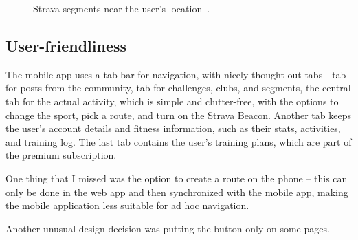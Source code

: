 \begin{figure}[htb!]
    \centering
        \caption{Strava segments near the user's location~\cite{strava-segments-img}.}
        \label{strava-segments-img}
\end{figure}

\subsection*{User-friendliness}
The mobile app uses a tab bar for navigation, with nicely thought out tabs -  tab for posts from the community,  tab for challenges, clubs, and segments,
the central  tab for the actual activity, which is simple and clutter-free, with the options to change the sport, pick a route, and turn on the Strava Beacon.
Another tab  keeps the user's account details and fitness information, such as their stats, activities, and training log.
The last tab  contains the user's training plans, which are part of the premium subscription.

One thing that I missed was the option to create a route on the phone -- this can only be done in the web app and then synchronized with the mobile app, making the mobile application less suitable for ad hoc navigation.

Another unusual design decision was putting the  button only on some pages.

